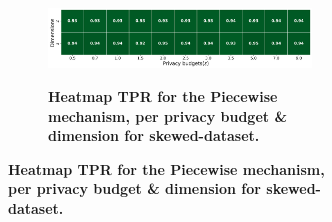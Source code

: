 \begin{figure}[H]
\begin{subfigure}[b]{0.9\textwidth}
        \begin{subfigure}[c]{1\textwidth}
            \caption{\textbf{Heatmap TPR for the Piecewise mechanism, per privacy budget \& dimension for skewed-dataset.}}
            \includegraphics[width=1\textwidth]{Results/kd-laplace/piecewise/skewed-dataset/tpr.png}
            \label{fig:privacy_tpr_skewed-dataset_adversial_advantage_piecewise}
        \end{subfigure}
    \end{subfigure}
    \hfill %
    \begin{subfigure}[b]{0.075\textwidth}

\end{subfigure}
\end{figure}
